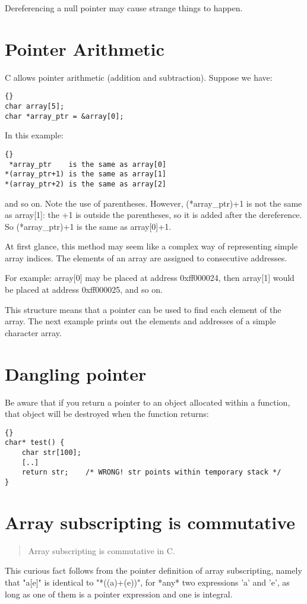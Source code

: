 \documentclass{report}
\begin{document}
Dereferencing a null pointer may cause strange things to happen.

\section{Pointer Arithmetic}	
C allows pointer arithmetic (addition and subtraction). Suppose we have: 
\begin{lstlisting}{}
char array[5]; 
char *array_ptr = &array[0]; 
\end{lstlisting}
In this example:
\begin{lstlisting}{}
 *array_ptr    is the same as array[0]
*(array_ptr+1) is the same as array[1]
*(array_ptr+2) is the same as array[2]
\end{lstlisting}
and so on.
Note the use of parentheses. 
However, (*array\_ptr)+1 is not the same as array[1]: the +1 is outside the parentheses,
so it is added after the dereference. So (*array\_ptr)+1 is the same as array[0]+1.

At first glance, this method may seem like a complex way of representing simple array indices. The elements of an array are assigned to consecutive addresses.

For example: array[0] may be placed at address 0xff000024, then array[1] would be placed at address 0xff000025, and so on.

This structure means that a pointer can be used to find each element of the array.
The next example prints out the elements and addresses of a simple character array. 





\section{Dangling pointer}
Be aware that if you return a pointer to an object allocated within a function, that object will be destroyed when the function returns:
\begin{lstlisting}{}
char* test() {
    char str[100];
    [..]
    return str;    /* WRONG! str points within temporary stack */
}
\end{lstlisting}


\section{Array subscripting is commutative}
\begin{quote}
Array subscripting is commutative in C.
\end{quote}
This curious fact follows from the pointer definition of array subscripting, namely that "a[e]" is identical to "*((a)+(e))", for *any* two expressions 'a' and 'e', as long as one of them is a pointer expression and one is integral.
	
\end{document}
